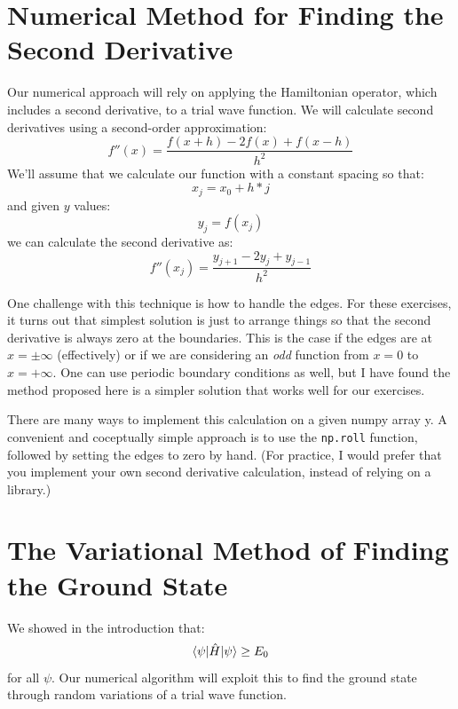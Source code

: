 \documentclass[12pt]{article}
\begin{document}
\section{Numerical Method for Finding the Second Derivative}

Our numerical approach will rely on applying the Hamiltonian operator,
which includes a second derivative, to a trial wave function.  We will
calculate second derivatives using a second-order approximation:
$$f''(x) = \frac{f(x+h)-2f(x)+f(x-h)}{h^2}$$
We'll assume that we calculate our function with a constant spacing so that:
$$x_j = x_0 + h * j$$
and given $y$ values:
$$y_j = f(x_j)$$
we can calculate the second derivative as:
$$f''(x_j) = \frac{y_{j + 1} - 2 y_j + y_{j-1}}{h^2}$$

One challenge with this technique is how to handle the edges.  For
these exercises, it turns out that simplest solution is just to
arrange things so that the second derivative is always zero at the
boundaries.  This is the case if the edges are at $x=\pm\infty$
(effectively) or if we are considering an {\em odd} function from
$x=0$ to $x=+\infty$.  One can use periodic boundary conditions as
well, but I have found the method proposed here is a simpler solution
that works well for our exercises.

There are many ways to implement this calculation on a given numpy
array y.  A convenient and coceptually simple approach is to use the
{\tt np.roll} function, followed by setting the edges to zero by hand.
(For practice, I would prefer that you implement your own second
derivative calculation, instead of relying on a library.)

\section{The Variational Method of Finding the Ground State}

We showed in the introduction that:
$$\braket{\psi|\hat{H}|\psi} \geq E_0$$ for all $\psi$.
Our numerical algorithm will exploit this to find the ground state
through random variations of a trial wave function.
\end{document}
